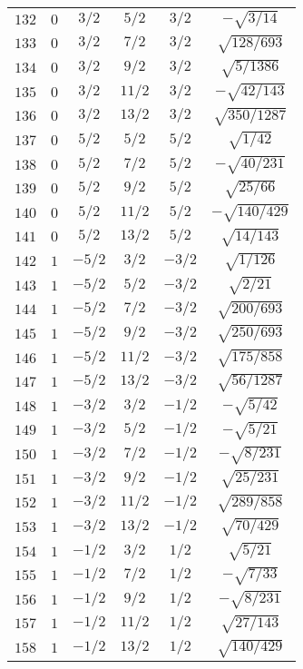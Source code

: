 \begin{table}
\begin{center}
\begin{tabular}{|c|c|c|c|c|c|}
$132$ & $0$ & $3/2$ & $5/2$ & $3/2$ & $-\sqrt{3/14}$ \\ 
$133$ & $0$ & $3/2$ & $7/2$ & $3/2$ & $\sqrt{128/693}$ \\ 
$134$ & $0$ & $3/2$ & $9/2$ & $3/2$ & $\sqrt{5/1386}$ \\ 
$135$ & $0$ & $3/2$ & $11/2$ & $3/2$ & $-\sqrt{42/143}$ \\ 
$136$ & $0$ & $3/2$ & $13/2$ & $3/2$ & $\sqrt{350/1287}$ \\ 
$137$ & $0$ & $5/2$ & $5/2$ & $5/2$ & $\sqrt{1/42}$ \\ 
$138$ & $0$ & $5/2$ & $7/2$ & $5/2$ & $-\sqrt{40/231}$ \\ 
$139$ & $0$ & $5/2$ & $9/2$ & $5/2$ & $\sqrt{25/66}$ \\ 
$140$ & $0$ & $5/2$ & $11/2$ & $5/2$ & $-\sqrt{140/429}$ \\ 
$141$ & $0$ & $5/2$ & $13/2$ & $5/2$ & $\sqrt{14/143}$ \\ 
$142$ & $1$ & $-5/2$ & $3/2$ & $-3/2$ & $\sqrt{1/126}$ \\ 
$143$ & $1$ & $-5/2$ & $5/2$ & $-3/2$ & $\sqrt{2/21}$ \\ 
$144$ & $1$ & $-5/2$ & $7/2$ & $-3/2$ & $\sqrt{200/693}$ \\ 
$145$ & $1$ & $-5/2$ & $9/2$ & $-3/2$ & $\sqrt{250/693}$ \\ 
$146$ & $1$ & $-5/2$ & $11/2$ & $-3/2$ & $\sqrt{175/858}$ \\ 
$147$ & $1$ & $-5/2$ & $13/2$ & $-3/2$ & $\sqrt{56/1287}$ \\ 
$148$ & $1$ & $-3/2$ & $3/2$ & $-1/2$ & $-\sqrt{5/42}$ \\ 
$149$ & $1$ & $-3/2$ & $5/2$ & $-1/2$ & $-\sqrt{5/21}$ \\ 
$150$ & $1$ & $-3/2$ & $7/2$ & $-1/2$ & $-\sqrt{8/231}$ \\ 
$151$ & $1$ & $-3/2$ & $9/2$ & $-1/2$ & $\sqrt{25/231}$ \\ 
$152$ & $1$ & $-3/2$ & $11/2$ & $-1/2$ & $\sqrt{289/858}$ \\ 
$153$ & $1$ & $-3/2$ & $13/2$ & $-1/2$ & $\sqrt{70/429}$ \\ 
$154$ & $1$ & $-1/2$ & $3/2$ & $1/2$ & $\sqrt{5/21}$ \\ 
$155$ & $1$ & $-1/2$ & $7/2$ & $1/2$ & $-\sqrt{7/33}$ \\ 
$156$ & $1$ & $-1/2$ & $9/2$ & $1/2$ & $-\sqrt{8/231}$ \\ 
$157$ & $1$ & $-1/2$ & $11/2$ & $1/2$ & $\sqrt{27/143}$ \\ 
$158$ & $1$ & $-1/2$ & $13/2$ & $1/2$ & $\sqrt{140/429}$ \\ 

\end{tabular}
\end{center}
\end{table}
